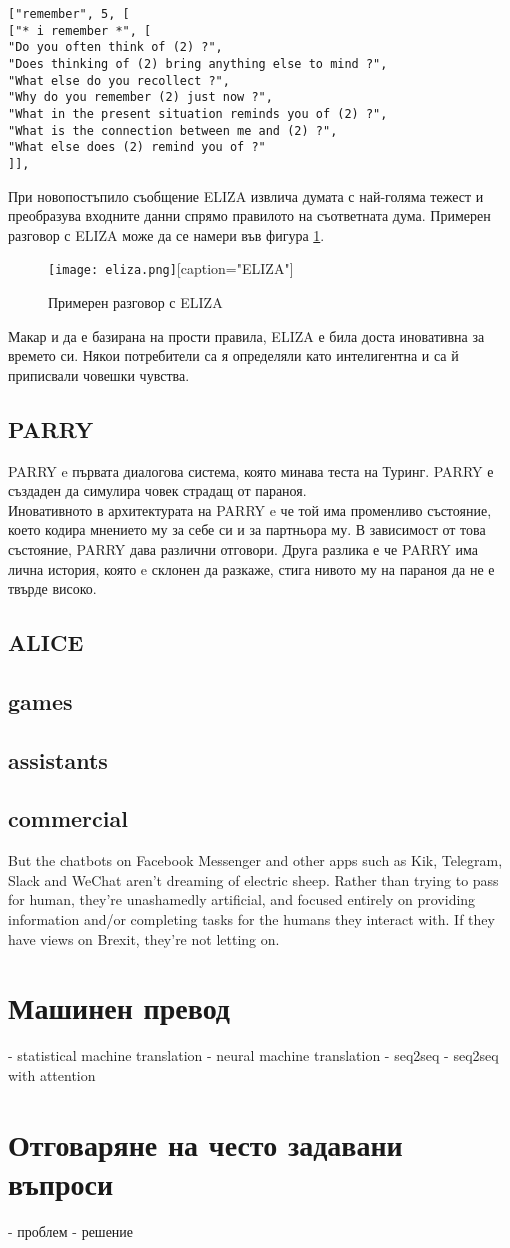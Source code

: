 \begin{verbatim}
["remember", 5, [
["* i remember *", [
"Do you often think of (2) ?",
"Does thinking of (2) bring anything else to mind ?",
"What else do you recollect ?",
"Why do you remember (2) just now ?",
"What in the present situation reminds you of (2) ?",
"What is the connection between me and (2) ?",
"What else does (2) remind you of ?"
]],
\end{verbatim}

При новопостъпило съобщение ELIZA извлича думата с най-голяма тежест и преобразува входните данни спрямо правилото на съответната дума. Примерен разговор с ELIZA може да се намери във фигура \ref{eliza-image}.
\begin{figure}
	\caption{Примерен разговор с ELIZA}
	\label{eliza-image}
	\texttt{[image: eliza.png]}[caption="ELIZA"] 
\end{figure}

Макар и да е базирана на прости правила, ELIZA е била доста иновативна за времето си. Някои потребители са я определяли като интелигентна и са й приписвали човешки чувства. 
\subsection{PARRY}
PARRY \cite{parry} e първата диалогова система, която минава теста на Туринг\cite{turing}. PARRY е създаден да симулира човек страдащ от параноя.  \\
Иновативното в архитектурата на PARRY e че той има променливо състояние, което кодира мнението му за себе си и за партньора му. В зависимост от това състояние, PARRY дава различни отговори. Друга разлика е че PARRY има лична история, която e склонен да разкаже, стига нивото му на параноя да не е твърде високо.
\subsection{ALICE}
\subsection{games}

\subsection{assistants}
\subsection{commercial}
But the chatbots on Facebook Messenger and other apps such as Kik, Telegram, Slack and WeChat aren’t dreaming of electric sheep. Rather than trying to pass for human, they’re unashamedly artificial, and focused entirely on providing information and/or completing tasks for the humans they interact with. If they have views on Brexit, they’re not letting on.

\section{Машинен превод}
- statistical machine translation
- neural machine translation
- seq2seq
- seq2seq with attention

\section{Отговаряне на често задавани въпроси}
- проблем
- решение

